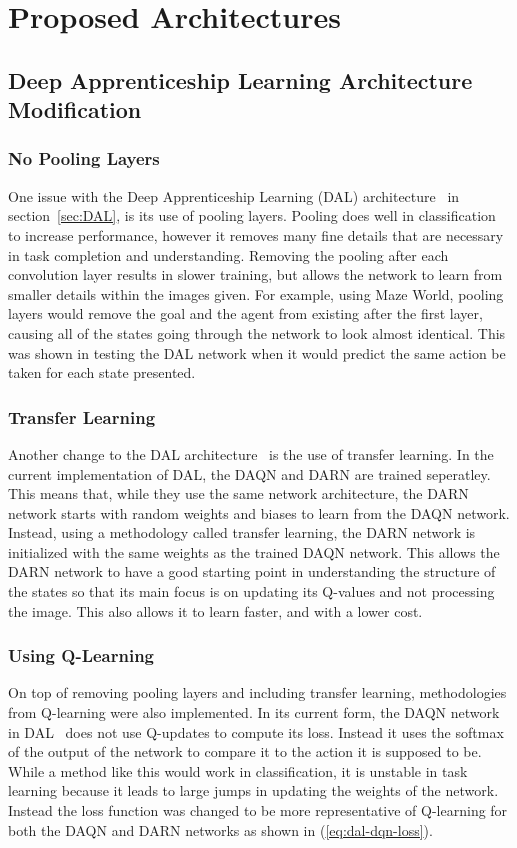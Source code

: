 \documentclass[12pt,american]{report}
\begin{document}
\chapter{Proposed Architectures}
\label{sec:proposed_architectures}
\section{Deep Apprenticeship Learning Architecture Modification}
\subsection{No Pooling Layers}
One issue with the Deep Apprenticeship Learning (DAL) architecture~\cite{markovikj2014deep} in section~\ref{sec:DAL}, is its use of pooling layers.  Pooling does well in classification to increase performance, however it removes many fine details that are necessary in task completion and understanding.  Removing the pooling after each convolution layer results in slower training, but allows the network to learn from smaller details within the images given.  For example, using Maze World, pooling layers would remove the goal and the agent from existing after the first layer, causing all of the states going through the network to look almost identical.  This was shown in testing the DAL network when it would predict the same action be taken for each state presented.
\subsection{Transfer Learning}
Another change to the DAL architecture~\cite{markovikj2014deep} is the use of transfer learning.  In the current implementation of DAL, the DAQN and DARN are trained seperatley.  This means that, while they use the same network architecture, the DARN network starts with random weights and biases to learn from the DAQN network.  Instead, using a methodology called transfer learning, the DARN network is initialized with the same weights as the trained DAQN network.  This allows the DARN network to have a good starting point in understanding the structure of the states so that its main focus is on updating its Q-values and not processing the image.  This also allows it to learn faster, and with a lower cost.
\subsection{Using Q-Learning}
On top of removing pooling layers and including transfer learning, methodologies from Q-learning were also implemented.  In its current form, the DAQN network in DAL~\cite{markovikj2014deep} does not use Q-updates to compute its loss.  Instead it uses the softmax of the output of the network to compare it to the action it is supposed to be.  While a method like this would work in classification, it is unstable in task learning because it leads to large jumps in updating the weights of the network.  Instead the loss function was changed to be more representative of Q-learning for both the DAQN and DARN networks as shown in (\ref{eq:dal-dqn-loss}).
\end{document}
